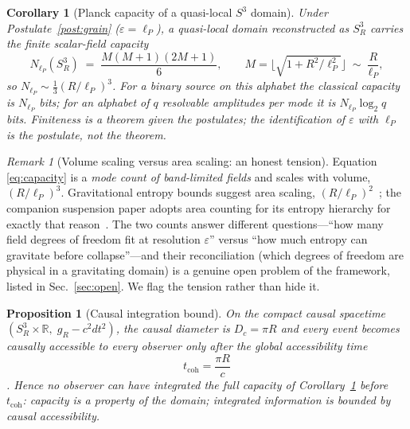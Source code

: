 \documentclass[11pt,a4paper]{article}
\newtheorem{proposition}[theorem]{Proposition}
\newtheorem{corollary}[theorem]{Corollary}
\theoremstyle{definition}
\theoremstyle{remark}
\newtheorem{remark}[theorem]{Remark}
\newcommand{\Sthree}{S^{3}}
\newcommand{\R}{\mathbb{R}}
\newcommand{\lP}{\ell_{P}}
\begin{document}
\begin{corollary}[Planck capacity of a quasi-local $\Sthree$ domain]
\label{cor:planck-capacity}
Under Postulate~\ref{post:grain} ($\varepsilon=\lP$), a quasi-local domain reconstructed as
$\Sthree_{R}$ carries the finite scalar-field capacity
\begin{equation}
N_{\lP}(\Sthree_{R})\;=\;\frac{M(M+1)(2M+1)}{6},\qquad
M=\Big\lfloor\sqrt{1+R^{2}/\lP^{2}}\Big\rfloor
\;\sim\;\frac{R}{\lP},
\end{equation}
so $N_{\lP}\sim\tfrac13(R/\lP)^{3}$.  For a binary source on this alphabet the classical
capacity is $N_{\lP}$ bits; for an alphabet of $q$ resolvable amplitudes per mode it is
$N_{\lP}\log_{2}q$ bits.  Finiteness is a theorem given the postulates; the identification of
$\varepsilon$ with $\lP$ is the postulate, not the theorem.
\end{corollary}

\begin{remark}[Volume scaling versus area scaling: an honest tension]
\label{rem:holography}
Equation \eqref{eq:capacity} is a \emph{mode count of band-limited fields} and scales with
volume, $(R/\lP)^{3}$.  Gravitational entropy bounds suggest area scaling,
$(R/\lP)^{2}$~\cite{Bousso1999}; the companion suspension paper adopts area counting for its
entropy hierarchy for exactly that reason~\cite{PB2026susp}.  The two counts answer different
questions---``how many field degrees of freedom fit at resolution $\varepsilon$'' versus ``how
much entropy can gravitate before collapse''---and their reconciliation (which degrees of
freedom are physical in a gravitating domain) is a genuine open problem of the framework, listed
in Sec.~\ref{sec:open}.  We flag the tension rather than hide it.
\end{remark}

\begin{proposition}[Causal integration bound]
\label{prop:coh}
On the compact causal spacetime $(\Sthree_{R}\times\R,\;g_{R}-c^{2}dt^{2})$, the causal
diameter is $D_{c}=\pi R$ and every event becomes causally accessible to every observer only
after the global accessibility time
\begin{equation}
t_{\mathrm{coh}}=\frac{\pi R}{c}
\end{equation}
\cite{PB2026light}.  Hence no observer can have integrated the full capacity of
Corollary~\ref{cor:planck-capacity} before $t_{\mathrm{coh}}$: capacity is a property of the
domain; \emph{integrated} information is bounded by causal accessibility.
\end{proposition}
\end{document}
